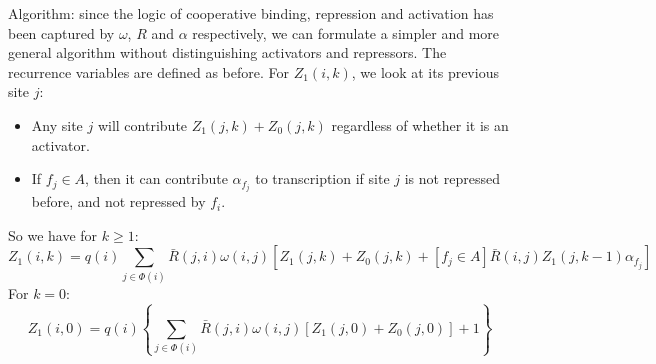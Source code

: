 \documentclass[11pt]{article}
\begin{document}
\begin{enumerate}
\begin{enumerate}
Algorithm: since the logic of cooperative binding, repression and activation has been captured by $\omega$, $R$ and $\alpha$ respectively, we can formulate a simpler and more general algorithm without distinguishing activators and repressors. The recurrence variables are defined as before. For $Z_1(i,k)$, we look at its previous site $j$: 
\begin{itemize}
\item Any site $j$ will contribute $Z_1(j,k) + Z_0(j,k)$ regardless of whether it is an activator. 
\item If $f_j \in A$, then it can contribute $\alpha_{f_j}$ to transcription if site $j$ is not repressed before, and not repressed by $f_i$.
\end{itemize}
So we have for $k \geq 1$: 
\begin{equation}
Z_1(i,k) = q(i) \sum_{j \in \Phi(i)} \bar{R}(j,i) \omega(i,j) \left[ Z_1(j,k) + Z_0(j,k) + [f_j \in A] \bar{R}(i,j) Z_1(j,k-1) \alpha_{f_j} \right]
\end{equation}
For $k = 0$:
\begin{equation}
Z_1(i,0) = q(i) \left\{ \sum_{j \in \Phi(i)} \bar{R}(j,i) \omega(i,j) \left[ Z_1(j,0) + Z_0(j,0) \right] + 1 \right\}
\end{equation}

\end{enumerate}
\end{enumerate}
\end{document}
